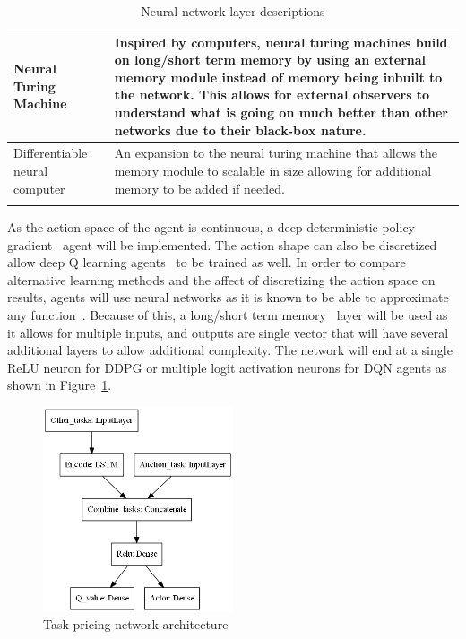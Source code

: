 \begin{longtable}{|p{3.5cm}|p{10cm}|}
    Neural Turing Machine~\citep{NTM} & Inspired by computers, neural turing machines build on long/short term memory
        by using an external memory module instead of memory being inbuilt to the network. This allows for external
        observers to understand what is going on much better than other networks due to their black-box nature. \\ \hline

    Differentiable neural computer~\citep{DNC} & An expansion to the neural turing machine that allows the memory
        module to scalable in size allowing for additional memory to be added if needed. \\ \hline
    \caption{Neural network layer descriptions}
    \label{tab:neural_network_layers}
\end{longtable}

As the action space of the agent is continuous, a deep deterministic policy gradient~\citep{ddpg} agent
will be implemented. The action shape can also be discretized allow deep Q learning agents~\cite{atari} to be trained
as well. In order to compare alternative learning methods and the affect of discretizing the action space on results,
agents will use neural networks as it is known to be able to approximate any
function~\citep{csaji2001approximation}. Because of this, a long/short term memory~\citep{LSTM} layer will be used as
it allows for multiple inputs, and outputs are single vector that will have several additional layers to allow
additional complexity. The network will end at a single ReLU neuron for DDPG or multiple logit activation neurons for
DQN agents as shown in Figure~\ref{fig:task_pricing_network_architecture}.

\begin{figure}
    \centering
    \includegraphics[width=0.5\textwidth]{figures/2_solution_figs/task_pricing_network_architecture.png}
    \caption{Task pricing network architecture}
    \label{fig:task_pricing_network_architecture}
\end{figure}

